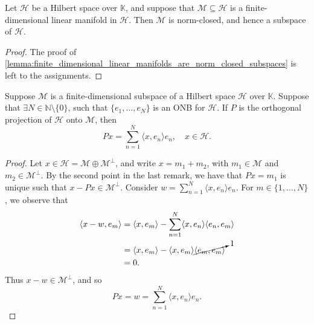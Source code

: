 \documentclass[notoc,notitlepage]{tufte-book}
\begin{document}
\begin{lemma}\label{lemma:finite_dimensional_linear_manifolds_are_norm_closed_subspaces}
  Let $\mathcal{H}$ be a Hilbert space over $\mathbb{K}$,
  and suppose that $\mathcal{M} \subseteq \mathcal{H}$ is a finite-dimensional
  linear manifold in $\mathcal{H}$.
  Then $\mathcal{M}$ is norm-closed, and hence a subspace of $\mathcal{H}$.
\end{lemma}

\begin{proof}
  The proof of
  \cref{lemma:finite_dimensional_linear_manifolds_are_norm_closed_subspaces}
  is left to the assignments.
\end{proof}

\begin{propo}\label{propo:formulae_for_orthogonal_projections_in_hilbert_spaces_onto_a_finite_dimensional_subspace}
  Suppose $\mathcal{M}$ is a finite-dimensional subspace
  of a Hilbert space $\mathcal{H}$ over $\mathbb{K}$.
  Suppose that $\exists N \in \mathbb{N} \setminus \{ 0 \}$, 
  such that $\{ e_1, \ldots, e_N \}$ is an ONB for $\mathcal{H}$.
  If $P$ is the orthogonal projection of $\mathcal{H}$ onto $\mathcal{M}$,
  then
  \begin{equation*}
    Px = \sum_{n=1}^{N} \langle x, e_n \rangle e_n, \quad x \in \mathcal{H}.
  \end{equation*}
\end{propo}

\begin{proof}
  Let $x \in \mathcal{H} = \mathcal{M} \oplus \mathcal{M}^\perp$,
  and write $x = m_1 + m_2$, with $m_1 \in \mathcal{M}$ and $m_2 \in \mathcal{M}^\perp$.
  By the second point in the last remark,
  we have that $Px = m_1$ is unique such that $x - Px \in \mathcal{M}^\perp$.
  Consider $w = \sum_{n=1}^{N} \langle x, e_n \rangle e_n$.
  For $m \in \{ 1, \ldots, N \}$, we observe that
  \begin{align*}
    \langle x - w, e_m \rangle
    &= \langle x, e_m \rangle
      - \sum_{n=1}^{N} \langle x, e_n \rangle \langle e_n, e_m \rangle \\
    &= \langle x, e_m \rangle - \langle x, e_m \rangle \cancelto{1}{\langle e_m, e_m \rangle} \\
    &= 0.
  \end{align*}
  Thus $x - w \in \mathcal{M}^\perp$, and so
  \begin{equation*}
    Px = w = \sum_{n=1}^{N} \langle x, e_n \rangle e_n.
  \end{equation*}
\end{proof}
\end{document}
